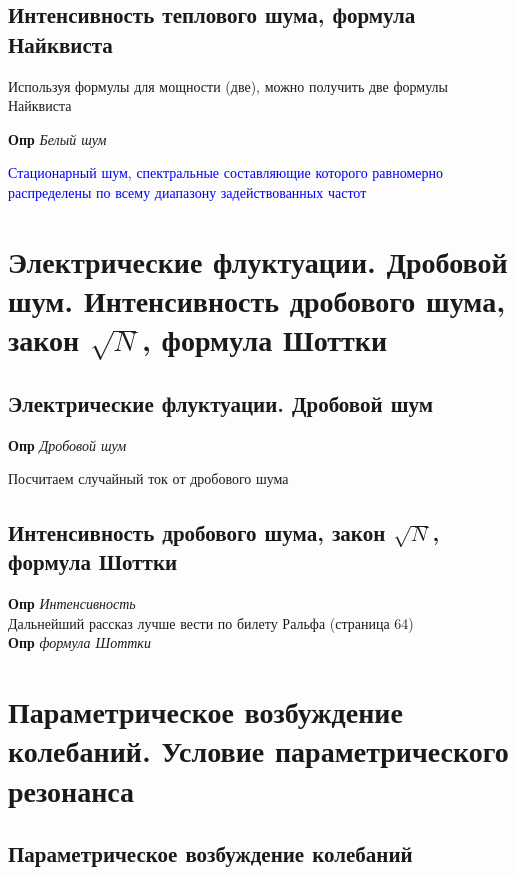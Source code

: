 \documentclass[a4paper, 14pt]{article}
\begin{document}
    \subsection{Интенсивность теплового шума, формула Найквиста}
    
    Используя формулы для мощности (две), можно получить две формулы Найквиста
    
    \textbf{Опр} \textit{Белый шум}
    
    \textcolor{blue}{Стационарный шум, спектральные составляющие которого равномерно распределены по всему диапазону
    задействованных частот}
    
    \section{Электрические флуктуации. Дробовой шум.
    Интенсивность дробового шума, закон $\sqrt{N}$, формула Шоттки}
    
    \subsection{Электрические флуктуации. Дробовой шум}
    
    \textbf{Опр} \textit{Дробовой шум}
    
    Посчитаем случайный ток от дробового шума
    
    \subsection{Интенсивность дробового шума, закон $\sqrt{N}$, формула Шоттки}
    
    \textbf{Опр} \textit{Интенсивность} \\
    
    Дальнейший рассказ лучше вести по билету Ральфа (страница 64) \\
    
    \textbf{Опр} \textit{формула Шоттки}
    
    \section{Параметрическое возбуждение колебаний.
    Условие параметрического резонанса}
    
    \subsection{Параметрическое возбуждение колебаний}
    
\end{document}

